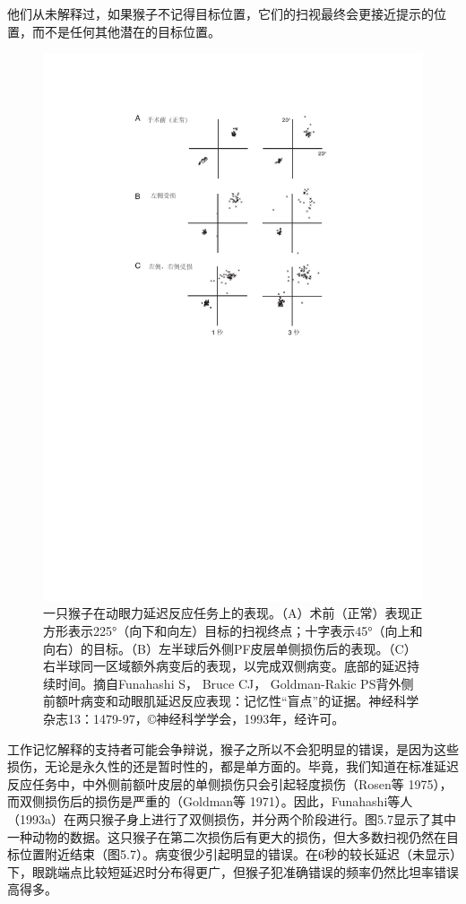 他们从未解释过，如果猴子不记得目标位置，它们的扫视最终会更接近提示的位置，而不是任何其他潜在的目标位置。
\begin{figure}
	\centering
	\includegraphics[width=0.7\linewidth]{image_pfc/Fig_5_7}
	\caption{一只猴子在动眼力延迟反应任务上的表现。（A）术前（正常）表现正方形表示225°（向下和向左）目标的扫视终点；十字表示45°（向上和向右）的目标。（B）左半球后外侧PF皮层单侧损伤后的表现。（C）右半球同一区域额外病变后的表现，以完成双侧病变。底部的延迟持续时间。摘自Funahashi S， Bruce CJ， Goldman-Rakic PS背外侧前额叶病变和动眼肌延迟反应表现：记忆性“盲点”的证据。神经科学杂志13：1479-97，©神经科学学会，1993年，经许可。}
	\label{fig:fig}
\end{figure}

工作记忆解释的支持者可能会争辩说，猴子之所以不会犯明显的错误，是因为这些损伤，无论是永久性的还是暂时性的，都是单方面的。毕竟，我们知道在标准延迟反应任务中，中外侧前额叶皮层的单侧损伤只会引起轻度损伤（Rosen等 1975），而双侧损伤后的损伤是严重的（Goldman等 1971）。因此，Funahashi等人（1993a）在两只猴子身上进行了双侧损伤，并分两个阶段进行。图5.7显示了其中一种动物的数据。这只猴子在第二次损伤后有更大的损伤，但大多数扫视仍然在目标位置附近结束（图5.7）。病变很少引起明显的错误。在6秒的较长延迟（未显示）下，眼跳端点比较短延迟时分布得更广，但猴子犯准确错误的频率仍然比坦率错误高得多。


